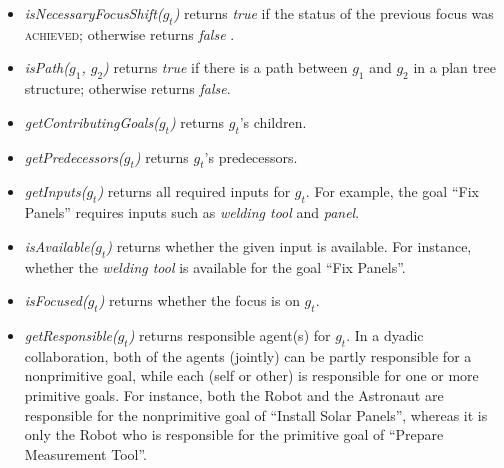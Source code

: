 \documentclass[12pt]{report}
\begin{document}
\begin{itemize}
  \item \textit{isNecessaryFocusShift($g_t$)} returns \textit{true} if the
  status of the previous focus was \textsc{achieved}; otherwise returns
  \textit{false} \cite{rich:focused-unfocused-users}.
  
  \item \textit{isPath($g_1$, $g_2$)} returns \textit{true} if there is a path
  between $g_1$ and $g_2$ in a plan tree structure; otherwise returns
  \textit{false}.
  
  
  \item \textit{getContributingGoals($g_t$)} returns $g_t$'s children.
  
  \item \textit{getPredecessors($g_t$)} returns $g_t$'s predecessors.
  
  \item \textit{getInputs($g_t$)} returns all required inputs for $g_t$. For
  example, the goal ``Fix Panels'' requires inputs such as \textit{welding tool}
  and \textit{panel}.
  
  \item \textit{isAvailable($g_t$)} returns whether the given input is
  available. For instance, whether the \textit{welding tool} is available for the
  goal ``Fix Panels''.
  
  
  \item \textit{isFocused($g_t$)} returns whether the focus is on $g_t$.
  
  \item \textit{getResponsible($g_t$)} returns responsible agent(s) for $g_t$.
  In a dyadic collaboration, both of the agents (jointly) can be partly
  responsible for a nonprimitive goal, while each (self or other) is responsible
  for one or more primitive goals. For instance, both the Robot and the
  Astronaut are responsible for the nonprimitive goal of ``Install Solar
  Panels'', whereas it is only the Robot who is responsible for the
  primitive goal of ``Prepare Measurement Tool''.
\end{itemize}
\end{document}
